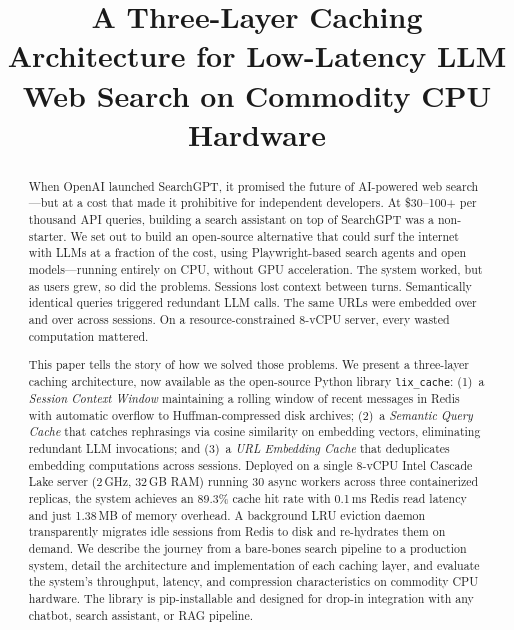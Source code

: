 \documentclass[conference]{IEEEtran}
\title{A Three-Layer Caching Architecture for Low-Latency LLM Web Search on Commodity CPU Hardware}
\author{
\IEEEauthorblockN{Ayushman Bhattacharya}
\IEEEauthorblockA{MyceliAI AÜ\\ayushman@myceli.ai}
}
\begin{document}
\maketitle

\begin{abstract}
When OpenAI launched SearchGPT, it promised the future of AI-powered web search---but at a cost that made it prohibitive for independent developers. At \$30--100+ per thousand API queries, building a search assistant on top of SearchGPT was a non-starter. We set out to build an open-source alternative that could surf the internet with LLMs at a fraction of the cost, using Playwright-based search agents and open models---running entirely on CPU, without GPU acceleration. The system worked, but as users grew, so did the problems. Sessions lost context between turns. Semantically identical queries triggered redundant LLM calls. The same URLs were embedded over and over across sessions. On a resource-constrained 8-vCPU server, every wasted computation mattered.

This paper tells the story of how we solved those problems. We present a three-layer caching architecture, now available as the open-source Python library \texttt{lix\_cache}: (1)~a \emph{Session Context Window} maintaining a rolling window of recent messages in Redis with automatic overflow to Huffman-compressed disk archives; (2)~a \emph{Semantic Query Cache} that catches rephrasings via cosine similarity on embedding vectors, eliminating redundant LLM invocations; and (3)~a \emph{URL Embedding Cache} that deduplicates embedding computations across sessions. Deployed on a single 8-vCPU Intel Cascade Lake server (2\,GHz, 32\,GB RAM) running 30 async workers across three containerized replicas, the system achieves an 89.3\% cache hit rate with 0.1\,ms Redis read latency and just 1.38\,MB of memory overhead. A background LRU eviction daemon transparently migrates idle sessions from Redis to disk and re-hydrates them on demand. We describe the journey from a bare-bones search pipeline to a production system, detail the architecture and implementation of each caching layer, and evaluate the system's throughput, latency, and compression characteristics on commodity CPU hardware. The library is pip-installable and designed for drop-in integration with any chatbot, search assistant, or RAG pipeline.
\end{abstract}
\end{document}
